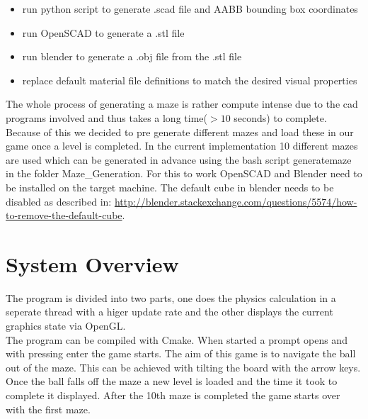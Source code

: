 \documentclass[11pt,a4paper]{article}
\begin{document}
\begin{itemize}
	\item run python script to generate .scad file and AABB bounding box coordinates
	\item run OpenSCAD to generate a .stl file
	\item run blender to generate a .obj file from the .stl file
	\item replace default material file definitions to match the desired visual properties
\end{itemize}

The whole process of generating a maze is rather compute intense due to the cad programs involved and thus takes a long time($>10$ seconds) to complete. Because of this we decided to pre generate different mazes and load these in our game once a level is completed. In the current implementation 10 different mazes are used which can be generated in advance using the bash script generatemaze in the folder Maze\_Generation. For this to work OpenSCAD and Blender need to be installed on the target machine. The default cube in blender needs to be disabled as described in: \url{http://blender.stackexchange.com/questions/5574/how-to-remove-the-default-cube}.


\section{System Overview}
\label{sec:systemOverview}
The program is divided into two parts, one does the physics calculation in a seperate thread with a higer update rate and the other displays the current graphics state via OpenGL. \\
The program can be compiled with Cmake. When started a prompt opens and with pressing enter the game starts.
The aim of this game is to navigate the ball out of the maze. This can be achieved with tilting the board with the arrow keys. Once the ball falls off the maze a new level is loaded and the time it took to complete it displayed. After the 10th maze is completed the game starts over with the first maze.
\end{document}
